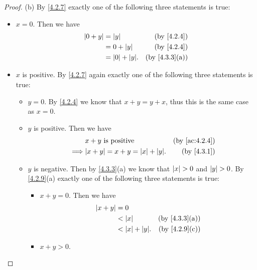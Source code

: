 \begin{proof}{(b)}
  By \cref{4.2.7} exactly one of the following three statements is true:
  \begin{itemize}
    \item \(x = 0\).
          Then we have
          \begin{align*}
            \abs{0 + y} & = \abs{y}            & \text{(by \cref{4.2.4})}    \\
                        & = 0 + \abs{y}        & \text{(by \cref{4.2.4})}    \\
                        & = \abs{0} + \abs{y}. & \text{(by \cref{4.3.3}(a))}
          \end{align*}
    \item \(x\) is positive.
          By \cref{4.2.7} again exactly one of the following three statements is true:
          \begin{itemize}
            \item \(y = 0\).
                  By \cref{4.2.4} we know that \(x + y = y + x\), thus this is the same case as \(x = 0\).
            \item \(y\) is positive.
                  Then we have
                  \begin{align*}
                             & x + y \text{ is positive}                & \text{(by \cref{ac:4.2.4})} \\
                    \implies & \abs{x + y} = x + y = \abs{x} + \abs{y}. & \text{(by \cref{4.3.1})}
                  \end{align*}
            \item \(y\) is negative.
                  Then by \cref{4.3.3}(a) we know that \(\left\lvert x\right\rvert > 0\) and \(\left\lvert y\right\rvert > 0\).
                  By \cref{4.2.9}(a) exactly one of the following three statements is true:
                  \begin{itemize}
                    \item \(x + y = 0\).
                          Then we have
                          \begin{align*}
                            \abs{x + y} & = 0                                                \\
                                        & < \abs{x}            & \text{(by \cref{4.3.3}(a))} \\
                                        & < \abs{x} + \abs{y}. & \text{(by \cref{4.2.9}(c))}
                          \end{align*}
                    \item \(x + y > 0\).

\end{itemize}
\end{itemize}
\end{itemize}
\end{proof}
